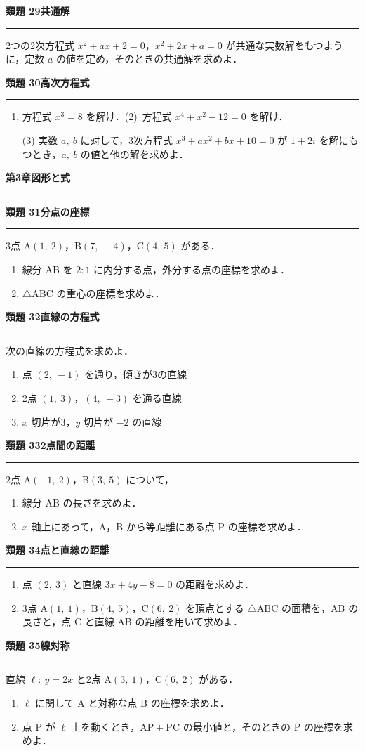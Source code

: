 \documentclass[a4paper,11pt]{ltjsarticle}
\newcommand{\mon}[2]{\Needspace{7\baselineskip}\vspace{10pt}%
  {\sffamily\bfseries 類題 #1\quad #2\par}\vspace{2pt}\hrule\vspace{4pt}}
\newcommand{\shou}[2]{\clearpage\markboth{#1\quad #2}{}%
  {\sffamily\bfseries\LARGE #1\quad #2\par}\vspace{2pt}\hrule height 1.2pt\vspace{4pt}}
\begin{document}
\mon{29}{共通解}
2つの2次方程式 $x^2+ax+2=0$，$x^2+2x+a=0$ が共通な実数解をもつように，定数 $a$ の値を定め，そのときの共通解を求めよ．

\mon{30}{高次方程式}
\begin{enumerate}
\item 方程式 $x^3=8$ を解け．\qquad (2)\ 方程式 $x^4+x^2-12=0$ を解け．
\item[(3)] 実数 $a,\ b$ に対して，3次方程式 $x^3+ax^2+bx+10=0$ が $1+2i$ を解にもつとき，$a,\ b$ の値と他の解を求めよ．
\end{enumerate}

\shou{第3章}{図形と式}
\mon{31}{分点の座標}
3点 $\mathrm A(1,\ 2)$，$\mathrm B(7,\ -4)$，$\mathrm C(4,\ 5)$ がある．
\begin{enumerate}
\item 線分 AB を $2:1$ に内分する点，外分する点の座標を求めよ．
\item $\triangle\mathrm{ABC}$ の重心の座標を求めよ．
\end{enumerate}

\mon{32}{直線の方程式}
次の直線の方程式を求めよ．
\begin{enumerate}
\item 点 $(2,\ -1)$ を通り，傾きが3の直線
\item 2点 $(1,\ 3)$，$(4,\ -3)$ を通る直線
\item $x$ 切片が3，$y$ 切片が $-2$ の直線
\end{enumerate}

\mon{33}{2点間の距離}
2点 $\mathrm A(-1,\ 2)$，$\mathrm B(3,\ 5)$ について，
\begin{enumerate}
\item 線分 AB の長さを求めよ．
\item $x$ 軸上にあって，A，B から等距離にある点 P の座標を求めよ．
\end{enumerate}

\mon{34}{点と直線の距離}
\begin{enumerate}
\item 点 $(2,\ 3)$ と直線 $3x+4y-8=0$ の距離を求めよ．
\item 3点 $\mathrm A(1,\ 1)$，$\mathrm B(4,\ 5)$，$\mathrm C(6,\ 2)$ を頂点とする $\triangle\mathrm{ABC}$ の面積を，AB の長さと，点 C と直線 AB の距離を用いて求めよ．
\end{enumerate}

\mon{35}{線対称}
直線 $\ell:\ y=2x$ と2点 $\mathrm A(3,\ 1)$，$\mathrm C(6,\ 2)$ がある．
\begin{enumerate}
\item $\ell$ に関して A と対称な点 B の座標を求めよ．
\item 点 P が $\ell$ 上を動くとき，$\mathrm{AP}+\mathrm{PC}$ の最小値と，そのときの P の座標を求めよ．
\end{enumerate}
\end{document}
